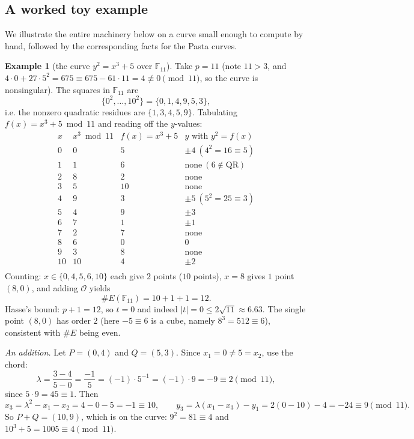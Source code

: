 \documentclass[11pt,a4paper]{article}
\theoremstyle{definition}
\newtheorem{example}[theorem]{Example}
\theoremstyle{remark}
\newcommand{\F}{\ensuremath{\mathbb{F}}}
\begin{document}
\subsection{A worked toy example}

We illustrate the entire machinery below on a curve small enough to compute by hand, followed by the corresponding facts for the Pasta curves.

\begin{example}[the curve \(y^2 = x^3 + 5\) over \(\F_{11}\)]\label{ellipticcurves:exa-toy}
Take \(p = 11\) (note \(11 > 3\), and \(4\cdot 0 + 27\cdot 5^2 = 675 \equiv 675 - 61\cdot 11 = 4 \not\equiv 0 \pmod{11}\), so the curve is nonsingular). The squares in \(\F_{11}\) are
\[
  \{0^2, \ldots, 10^2\} = \{0, 1, 4, 9, 5, 3\},
\]
i.e. the nonzero quadratic residues are \(\{1, 3, 4, 5, 9\}\). Tabulating \(f(x) = x^3 + 5 \bmod 11\) and reading off the \(y\)-values:
\[
\begin{array}{c|c|c|l}
  x & x^3 \bmod 11 & f(x) = x^3 + 5 & y \text{ with } y^2 = f(x) \\\hline
  0 & 0 & 5  & \pm 4 \ (4^2 = 16 \equiv 5) \\
  1 & 1 & 6  & \text{none} \ (6 \notin \text{QR}) \\
  2 & 8 & 2  & \text{none} \\
  3 & 5 & 10 & \text{none} \\
  4 & 9 & 3  & \pm 5 \ (5^2 = 25 \equiv 3) \\
  5 & 4 & 9  & \pm 3 \\
  6 & 7 & 1  & \pm 1 \\
  7 & 2 & 7  & \text{none} \\
  8 & 6 & 0  & 0 \\
  9 & 3 & 8  & \text{none} \\
  10 & 10 & 4 & \pm 2 \\
\end{array}
\]
Counting: \(x \in \{0,4,5,6,10\}\) each give \(2\) points (\(10\) points), \(x = 8\) gives \(1\) point \((8, 0)\), and adding \(\mathcal{O}\) yields
\[
  \#E(\F_{11}) = 10 + 1 + 1 = 12 .
\]
Hasse's bound: \(p + 1 = 12\), so \(t = 0\) and indeed \(|t| = 0 \leq 2\sqrt{11} \approx 6.63\). The single point \((8,0)\) has order \(2\) (here \(-5 \equiv 6\) is a cube, namely \(8^3 = 512 \equiv 6\)), consistent with \(\#E\) being even.

\smallskip
\emph{An addition.} Let \(P = (0, 4)\) and \(Q = (5, 3)\). Since \(x_1 = 0 \neq 5 = x_2\), use the chord:
\[
  \lambda = \frac{3 - 4}{5 - 0} = \frac{-1}{5} = (-1)\cdot 5^{-1} = (-1)\cdot 9 = -9 \equiv 2 \pmod{11},
\]
since \(5\cdot 9 = 45 \equiv 1\). Then
\[
  x_3 = \lambda^2 - x_1 - x_2 = 4 - 0 - 5 = -1 \equiv 10, \qquad
  y_3 = \lambda(x_1 - x_3) - y_1 = 2(0 - 10) - 4 = -24 \equiv 9 \pmod{11}.
\]
So \(P + Q = (10, 9)\), which is on the curve: \(9^2 = 81 \equiv 4\) and \(10^3 + 5 = 1005 \equiv 4 \pmod{11}\). \checkmark


\end{example}
\end{document}
